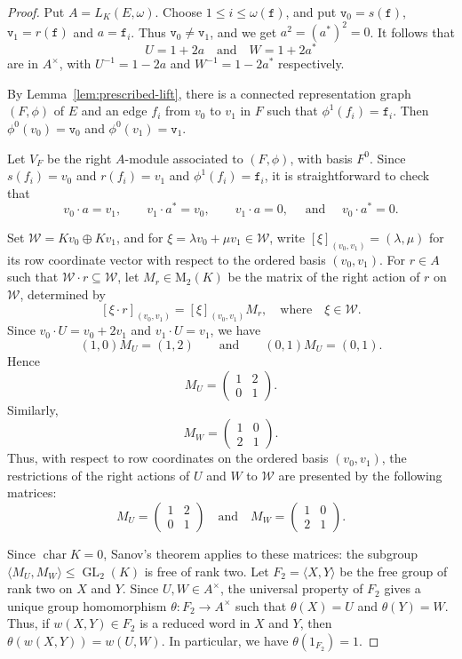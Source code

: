\documentclass{article}
\theoremstyle{definition}
\begin{document}
\begin{proof}
Put $A=L_K(E,\omega)$. Choose $1\leq i\leq\omega(\mathtt{f})$, and put $\mathtt{v}_0=s(\mathtt{f})$, $\mathtt{v}_1=r(\mathtt{f})$ and $a=\mathtt{f}_i$.
Thus $\mathtt{v}_0\neq \mathtt{v}_1$, and we get $a^2=(a^*)^2=0$. It
follows that
$$
U=1+2a\quad\text{and}\quad W=1+2a^*
$$
are in $A^\times$, with $U^{-1}=1-2a$ and $W^{-1}=1-2a^*$ respectively.

By Lemma~\ref{lem:prescribed-lift}, there is a connected representation graph
$(F,\phi)$ of $E$ and an edge $f_i$ from $v_0$ to $v_1$ in $F$ such that $\phi^1(f_i)=\mathtt{f}_i$. Then $\phi^0(v_0)=\mathtt{v}_0$ and $\phi^0(v_1)=\mathtt{v}_1$.

Let $V_F$ be the right $A$-module associated to $(F,\phi)$, with basis
$F^0$. 
Since $s(f_i)=v_0$ and $r(f_i)=v_1$ and $\phi^1(f_i)=\mathtt{f}_i$, it is straightforward to check that 
$$
v_0\cdot a=v_1,\qquad v_1\cdot a^*=v_0, \qquad v_1\cdot a=0, \quad\text{ and }\quad v_0\cdot a^*=0.
$$

Set $\mathcal W=Kv_0\oplus Kv_1$, and for
$\xi=\lambda v_0+\mu v_1\in\mathcal W$, write $[\xi]_{(v_0,v_1)}=(\lambda,\mu)$
for its row coordinate vector with respect to the ordered basis $(v_0,v_1)$.
For $r\in A$ such that $\mathcal W \cdot r \subseteq \mathcal W$, let $M_r\in \mathrm{M}_2(K)$ be
the matrix of the right action of $r$ on $\mathcal W$, determined by
$$
[\xi\cdot r]_{(v_0,v_1)}=[\xi]_{(v_0,v_1)}M_r,\quad\text{where}\quad\xi\in\mathcal W.
$$
Since $v_0\cdot U=v_0+2v_1$ and $v_1\cdot U=v_1$, we have
$$
(1,0)M_U=(1,2)\qquad\text{and}\qquad (0,1)M_U=(0,1).
$$
Hence
$$
M_U=
\begin{pmatrix}
1&2\\
0&1
\end{pmatrix}.
$$
Similarly,
$$
M_W=
\begin{pmatrix}
1&0\\
2&1
\end{pmatrix}.
$$
Thus, with respect to row coordinates on the ordered basis $(v_0,v_1)$, the
restrictions of the right actions of $U$ and $W$ to $\mathcal W$ are presented by the following matrices:
$$
M_U=
\begin{pmatrix}
1&2\\
0&1
\end{pmatrix}
\quad\text{and}\quad
M_W=
\begin{pmatrix}
1&0\\
2&1
\end{pmatrix}.
$$

Since $\operatorname{char}K=0$, Sanov's theorem \cite{S} applies
to these matrices: the subgroup
$\langle M_U,M_W\rangle\leq \operatorname{GL}_2(K)$ is free of rank two.
Let $F_2=\langle X,Y\rangle$ be the free group of rank two on $X$ and $Y$.
Since $U,W\in A^\times$, the universal property of $F_2$ gives a
unique group homomorphism $\theta:F_2\longrightarrow A^\times$ such that $\theta(X)=U$ and $\theta(Y)=W$.
Thus, if $w(X,Y)\in F_2$ is a reduced word in $X$ and $Y$, then $\theta(w(X,Y))=w(U,W)$.
In particular, we have $\theta(1_{F_2})=1$.


\end{proof}
\end{document}
